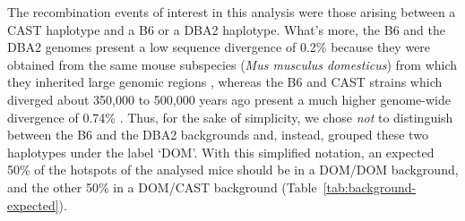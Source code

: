 %
%
%
%





\begin{mccorrection}
The recombination events of interest in this analysis were those arising between a CAST haplotype and a B6 or a DBA2 haplotype.
What's more, the B6 and the DBA2 genomes present a low sequence divergence of 0.2\% \citep{keane2011mouse} because they were obtained from the same mouse subspecies (\textit{Mus musculus domesticus}) from which they inherited large genomic regions \citep{davis2005genomewide}, whereas the B6 and CAST strains which diverged about 350,000 to 500,000 years ago \citep{geraldes2008inferring} present a much higher genome-wide divergence of 0.74\% \citep{keane2011mouse}.
Thus, for the sake of simplicity, we chose \textit{not} to distinguish between the B6 and the DBA2 backgrounds and, instead, grouped these two haplotypes under the label ‘DOM’.
With this simplified notation, an expected 50\% of the hotspots of the analysed mice should be in a DOM/DOM background, and the other 50\% in a DOM/CAST background (Table~\ref{tab:background-expected}).\\
\end{mccorrection}

